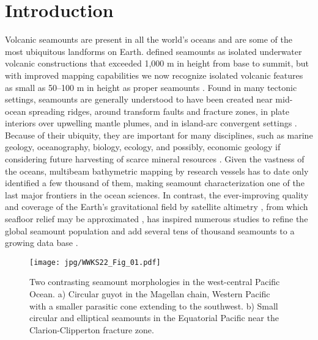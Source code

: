 %

\section{Introduction}
Volcanic seamounts are present in all the world's oceans and are some of the most ubiquitous
landforms on Earth. \citet{M1964} defined seamounts as isolated underwater volcanic constructions
that exceeded 1,000 m in height from base to summit, but with improved mapping capabilities we now
recognize isolated volcanic features as small as 50–100 m in height as proper seamounts \citep[e.g.,~][]{SC1990}.
Found in many tectonic settings, seamounts are generally understood to have been created near mid-ocean
spreading ridges, around transform faults and fracture zones, in plate interiors over upwelling
mantle plumes, and in island-arc convergent settings
\citep[e.g.,~][]{SC2010}. Because of their ubiquity, they are important for many disciplines, such as
marine geology, oceanography, biology, ecology, and possibly, economic geology if considering future harvesting of
scarce mineral resources \citep[e.g.,~][]{WSK2010,WK2010}. Given the vastness of the oceans, multibeam bathymetric
mapping by research vessels has to date only identified a few thousand of them, making seamount
characterization one of the last major frontiers in the ocean sciences. In contrast, the ever-improving
quality and coverage of the Earth's gravitational field by
satellite altimetry \citep[e.g.,~][]{Setal2021}, from which seafloor relief may be approximated
\citep[e.g.,~][]{SS1997}, has inspired numerous studies to refine the global seamount population and add several
tens of thousand seamounts to a growing data base \citep{CS1988,WL1997,W2001,KL2004,KW2011,G2022}. 
\begin{figure}
\centering
\noindent \texttt{[image: jpg/WWKS22\_Fig\_01.pdf]}
\caption{Two contrasting seamount morphologies in the west-central Pacific Ocean. a) Circular guyot in the Magellan chain,
Western Pacific with a smaller parasitic cone extending to the southwest. b) Small circular and
elliptical seamounts in the Equatorial Pacific near the Clarion-Clipperton fracture zone.}
\label{WWKS22_Fig_smt}
\end{figure}


